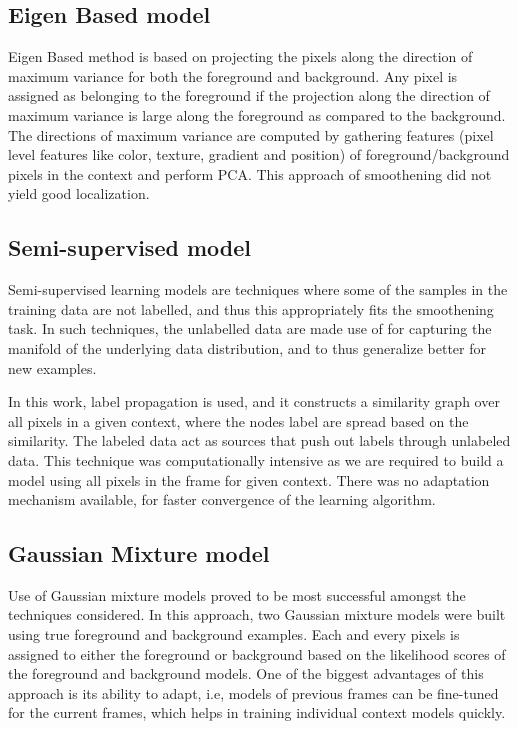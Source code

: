 \subsection{Eigen Based model}
Eigen Based method is based on projecting the pixels along the direction of maximum variance for both the foreground and background.  Any pixel is assigned as belonging to the foreground if the projection along the direction of maximum variance is large along the foreground as compared to the background.  The directions of maximum variance are computed by gathering features (pixel level features like color, texture, gradient and position) of foreground/background pixels in the context and perform PCA.  This approach of smoothening did not yield good localization.

\subsection{Semi-supervised model}
Semi-supervised learning models are techniques where some of the samples in the training data are not labelled, and thus this appropriately fits the smoothening task.  In such techniques, the unlabelled data are made use of for capturing the manifold of the underlying data distribution, and to thus generalize better for new examples. 
\par In this work, label propagation is used, and it constructs a similarity graph over all pixels in a given context, where the nodes label are spread based on the similarity.   The labeled data act as sources that push out labels through unlabeled data.  This technique was computationally intensive as we are required to build a model using all pixels in the frame for given context.  There was no adaptation mechanism available, for faster convergence of the learning algorithm.

\subsection{Gaussian Mixture model}
Use of Gaussian mixture models proved to be most successful amongst the techniques considered. In this approach, two Gaussian mixture models were built using true foreground and background examples. Each and every pixels is assigned to either the foreground or background based on the likelihood scores of the foreground and background models.  One of the biggest advantages of this approach is its ability to adapt, i.e, models of previous frames can be fine-tuned for the current frames, which helps in training individual context models quickly.


